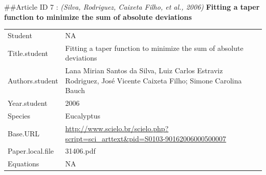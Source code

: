 \documentclass[]{article}
\begin{document}
\#\#Article ID 7 : \emph{(Silva, Rodriguez, Caixeta Filho, et al.,
2006)} \textbf{Fitting a taper function to minimize the sum of absolute
deviations}

\begin{longtable}[]{@{}ll@{}}
\toprule
\endhead
\begin{minipage}[t]{0.21\columnwidth}\raggedright
Student\strut
\end{minipage} & \begin{minipage}[t]{0.73\columnwidth}\raggedright
NA\strut
\end{minipage}\tabularnewline
\begin{minipage}[t]{0.21\columnwidth}\raggedright
Title.student\strut
\end{minipage} & \begin{minipage}[t]{0.73\columnwidth}\raggedright
Fitting a taper function to minimize the sum of absolute
deviations\strut
\end{minipage}\tabularnewline
\begin{minipage}[t]{0.21\columnwidth}\raggedright
Authors.student\strut
\end{minipage} & \begin{minipage}[t]{0.73\columnwidth}\raggedright
Lana Mirian Santos da Silva, Luiz Carlos Estraviz Rodriguez, José
Vicente Caixeta Filho; Simone Carolina Bauch\strut
\end{minipage}\tabularnewline
\begin{minipage}[t]{0.21\columnwidth}\raggedright
Year.student\strut
\end{minipage} & \begin{minipage}[t]{0.73\columnwidth}\raggedright
2006\strut
\end{minipage}\tabularnewline
\begin{minipage}[t]{0.21\columnwidth}\raggedright
Species\strut
\end{minipage} & \begin{minipage}[t]{0.73\columnwidth}\raggedright
Eucalyptus\strut
\end{minipage}\tabularnewline
\begin{minipage}[t]{0.21\columnwidth}\raggedright
Base.URL\strut
\end{minipage} & \begin{minipage}[t]{0.73\columnwidth}\raggedright
\url{http://www.scielo.br/scielo.php?script=sci_arttext\&pid=S0103-90162006000500007}\strut
\end{minipage}\tabularnewline
\begin{minipage}[t]{0.21\columnwidth}\raggedright
Paper.local.file\strut
\end{minipage} & \begin{minipage}[t]{0.73\columnwidth}\raggedright
31406.pdf\strut
\end{minipage}\tabularnewline
\begin{minipage}[t]{0.21\columnwidth}\raggedright
Equations\strut
\end{minipage} & \begin{minipage}[t]{0.73\columnwidth}\raggedright
NA\strut
\end{minipage}\tabularnewline
\bottomrule
\end{longtable}
\end{document}
